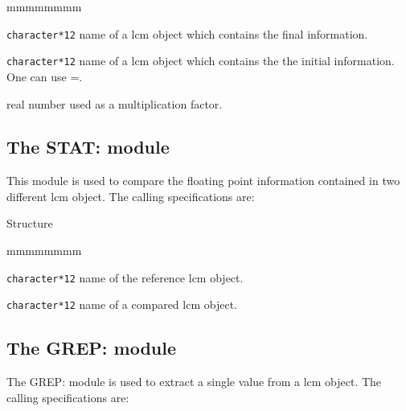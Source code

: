 \begin{ListeDeDescription}{mmmmmmmm}

\item[\dusa{NAME1}] {\tt character*12} name of a {\sc lcm} object which
contains the final information.

\item[\dusa{NAME2}] {\tt character*12} name of a {\sc lcm} object which
contains the the initial information. One can use
=.

\item[\dusa{real}] real number used as a multiplication factor.

\end{ListeDeDescription}

\clearpage

\subsection{The STAT: module}\label{sect:STATData}

This module is used to compare the floating point information contained in two
different {\sc lcm} object. The calling
specifications are:

\begin{DataStructure}{Structure }
   \moc{;}
\end{DataStructure}

\begin{ListeDeDescription}{mmmmmmmm}

\item[\dusa{NAME1}] {\tt character*12} name of the reference {\sc lcm} object.

\item[\dusa{NAME2}] {\tt character*12} name of a compared {\sc lcm} object.

\end{ListeDeDescription}

\clearpage

\subsection{The GREP: module}\label{sect:GREPData}

 The GREP: module is used to extract a single value from a {\sc lcm} object. The
calling specifications are:

\vskip -0.2cm

